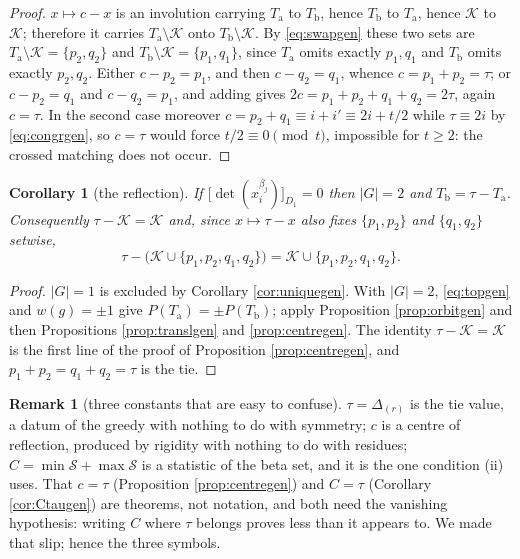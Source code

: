 \documentclass[11pt,reqno]{amsart}
\theoremstyle{plain}
\newtheorem{corollary}[theorem]{Corollary}
\theoremstyle{definition}
\newtheorem{remark}[theorem]{Remark}
\begin{document}
\begin{proof}
$x\mapsto c-x$ is an involution carrying $T_{\mathrm a}$ to $T_{\mathrm b}$, hence $T_{\mathrm b}$ to
$T_{\mathrm a}$, hence $\mathcal{K}$ to $\mathcal{K}$; therefore it carries
$T_{\mathrm a}\setminus\mathcal{K}$ onto $T_{\mathrm b}\setminus\mathcal{K}$. By \eqref{eq:swapgen}
these two sets are $T_{\mathrm a}\setminus\mathcal{K}=\{p_2,q_2\}$ and
$T_{\mathrm b}\setminus\mathcal{K}=\{p_1,q_1\}$, since $T_{\mathrm a}$ omits exactly $p_1,q_1$ and
$T_{\mathrm b}$ omits exactly $p_2,q_2$. Either $c-p_2=p_1$, and then $c-q_2=q_1$, whence
$c=p_1+p_2=\tau$; or $c-p_2=q_1$ and $c-q_2=p_1$, and adding gives $2c=p_1+p_2+q_1+q_2=2\tau$, again
$c=\tau$. In the second case moreover $c=p_2+q_1\equiv i+i'\equiv2i+t/2$ while $\tau\equiv2i$ by
\eqref{eq:congrgen}, so $c=\tau$ would force $t/2\equiv0\pmod t$, impossible for $t\ge2$: the crossed
matching does not occur.
\end{proof}

\begin{corollary}[the reflection]\label{cor:reflectgen}
If $\bigl[\det(x_i^{\beta_j})\bigr]_{D_1}=0$ then $|G|=2$ and $T_{\mathrm b}=\tau-T_{\mathrm a}$.
Consequently $\tau-\mathcal{K}=\mathcal{K}$ and, since $x\mapsto\tau-x$ also fixes $\{p_1,p_2\}$ and
$\{q_1,q_2\}$ setwise,
\begin{equation}\label{eq:Ssymgen}
  \tau-\bigl(\mathcal{K}\cup\{p_1,p_2,q_1,q_2\}\bigr)=\mathcal{K}\cup\{p_1,p_2,q_1,q_2\}.
\end{equation}
\end{corollary}

\begin{proof}
$|G|=1$ is excluded by Corollary \ref{cor:uniquegen}. With $|G|=2$, \eqref{eq:topgen} and
$w(g)=\pm1$ give $P(T_{\mathrm a})=\pm P(T_{\mathrm b})$; apply Proposition \ref{prop:orbitgen} and
then Propositions \ref{prop:translgen} and \ref{prop:centregen}. The identity
$\tau-\mathcal{K}=\mathcal{K}$ is the first line of the proof of Proposition \ref{prop:centregen}, and
$p_1+p_2=q_1+q_2=\tau$ is the tie.
\end{proof}

\begin{remark}[three constants that are easy to confuse]
$\tau=\Delta_{(r)}$ is the tie value, a datum of the greedy with nothing to do with symmetry; $c$ is a
centre of reflection, produced by rigidity with nothing to do with residues; $C=\min\mathcal{S}+\max\mathcal{S}$
is a statistic of the beta set, and it is the one condition \textup{(ii)} uses. That $c=\tau$
\textup{(}Proposition \ref{prop:centregen}\textup{)} and $C=\tau$ \textup{(}Corollary
\ref{cor:Ctaugen}\textup{)} are theorems, not notation, and both need the vanishing hypothesis:
writing $C$ where $\tau$ belongs proves less than it appears to. We made that slip; hence the three
symbols.
\end{remark}
\end{document}
